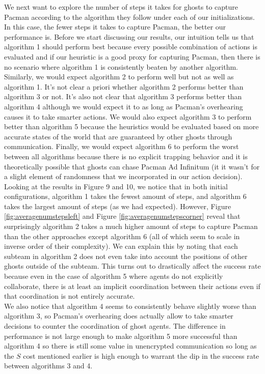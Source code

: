 \documentclass[11pt]{article}
\begin{document}
\begin{multicols}{2}
\noindent We next want to explore the number of steps it takes for ghosts to capture Pacman according to the algorithm they follow under each of our initializations. In this case, the fewer steps it takes to capture Pacman, the better our performance is. Before we start discussing our results, our intuition tells us that algorithm 1 should perform best because every possible combination of actions is evaluated and if our heuristic is a good proxy for capturing Pacman, then there is no scenario where algorithm 1 is consistently beaten by another algorithm. Similarly, we would expect algorithm 2 to perform well but not as well as algorithm 1. It's not clear a priori whether algorithm 2 performs better than algorithm 3 or not. It's also not clear that algorithm 3 performs better than algorithm 4 although we would expect it to as long as Pacman's overhearing causes it to take smarter actions. We would also expect algorithm 3 to perform better than algorithm 5 because the heuristics would be evaluated based on more accurate states of the world that are guaranteed by other ghosts through communication. Finally, we would expect algorithm 6 to perform the worst between all algorithms because there is no explicit trapping behavior and it is theoretically possible that ghosts can chase Pacman Ad Infinitum (it it wasn't for a slight element of randomness that we incorporated in our action decision). \\
Looking at the results in Figure 9 and 10, we notice that in both initial configurations, algorithm 1 takes the fewest amount of steps, and algorithm 6 takes the largest amount of steps (as we had expected). However, Figure \ref{fig:averagenumstepsleft} and Figure \ref{fig:averagenumstepscorner} reveal that surprisingly algorithm 2 takes a much higher amount of steps to capture Pacman than the other approaches except algorithm 6 (all of which seem to scale in inverse order of their complexity). We can explain this by noting that each subteam in algorithm 2 does not even take into account the positions of other ghosts outside of the subteam. This turns out to drastically affect the success rate because even in the case of algorithm 5 where agents do not explicitly collaborate, there is at least an implicit coordination between their actions even if that coordination is not entirely accurate.\\
We also notice that algorithm 4 seems to consistently behave slightly worse than algorithm 3, so Pacman's overhearing does actually allow to take smarter decisions to counter the coordination of ghost agents. The difference in performance is not large enough to make algorithm 5 more successful than algorithm 4 so there is still some value in unencrypted communication so long as the $S$ cost mentioned earlier is high enough to warrant the dip in the success rate between algorithms 3 and 4.\\

\end{multicols}
\end{document}
